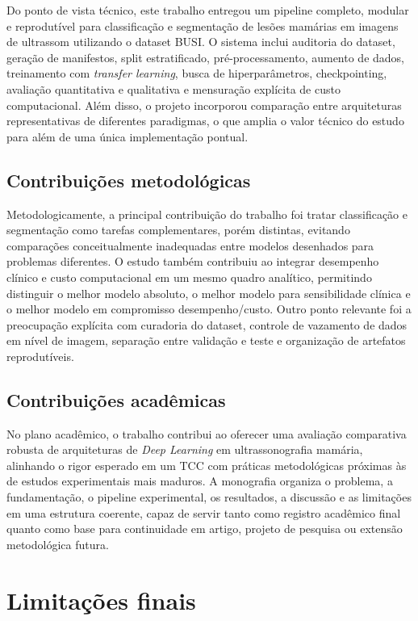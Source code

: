 \documentclass[tcc,capa]{texufpel}
\begin{document}
Do ponto de vista técnico, este trabalho entregou um pipeline completo, modular e reprodutível para classificação e segmentação de lesões mamárias em imagens de ultrassom utilizando o dataset BUSI. O sistema inclui auditoria do dataset, geração de manifestos, split estratificado, pré-processamento, aumento de dados, treinamento com \textit{transfer learning}, busca de hiperparâmetros, checkpointing, avaliação quantitativa e qualitativa e mensuração explícita de custo computacional. Além disso, o projeto incorporou comparação entre arquiteturas representativas de diferentes paradigmas, o que amplia o valor técnico do estudo para além de uma única implementação pontual. 

\subsection{Contribuições metodológicas}

Metodologicamente, a principal contribuição do trabalho foi tratar classificação e segmentação como tarefas complementares, porém distintas, evitando comparações conceitualmente inadequadas entre modelos desenhados para problemas diferentes. O estudo também contribuiu ao integrar desempenho clínico e custo computacional em um mesmo quadro analítico, permitindo distinguir o melhor modelo absoluto, o melhor modelo para sensibilidade clínica e o melhor modelo em compromisso desempenho/custo. Outro ponto relevante foi a preocupação explícita com curadoria do dataset, controle de vazamento de dados em nível de imagem, separação entre validação e teste e organização de artefatos reprodutíveis. 

\subsection{Contribuições acadêmicas}

No plano acadêmico, o trabalho contribui ao oferecer uma avaliação comparativa robusta de arquiteturas de \textit{Deep Learning} em ultrassonografia mamária, alinhando o rigor esperado em um TCC com práticas metodológicas próximas às de estudos experimentais mais maduros. A monografia organiza o problema, a fundamentação, o pipeline experimental, os resultados, a discussão e as limitações em uma estrutura coerente, capaz de servir tanto como registro acadêmico final quanto como base para continuidade em artigo, projeto de pesquisa ou extensão metodológica futura. 

\section{Limitações finais}
\end{document}

